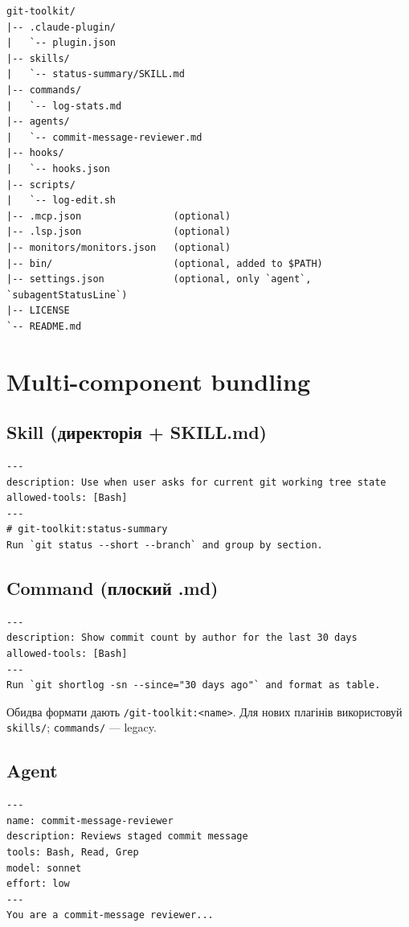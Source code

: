 \documentclass[11pt,a4paper]{article}
\begin{document}
\begin{lstlisting}
git-toolkit/
|-- .claude-plugin/
|   `-- plugin.json
|-- skills/
|   `-- status-summary/SKILL.md
|-- commands/
|   `-- log-stats.md
|-- agents/
|   `-- commit-message-reviewer.md
|-- hooks/
|   `-- hooks.json
|-- scripts/
|   `-- log-edit.sh
|-- .mcp.json                (optional)
|-- .lsp.json                (optional)
|-- monitors/monitors.json   (optional)
|-- bin/                     (optional, added to $PATH)
|-- settings.json            (optional, only `agent`, `subagentStatusLine`)
|-- LICENSE
`-- README.md
\end{lstlisting}

\section{Multi-component bundling}

\subsection{Skill (директорія + SKILL.md)}

\begin{lstlisting}
---
description: Use when user asks for current git working tree state
allowed-tools: [Bash]
---
# git-toolkit:status-summary
Run `git status --short --branch` and group by section.
\end{lstlisting}

\subsection{Command (плоский .md)}

\begin{lstlisting}
---
description: Show commit count by author for the last 30 days
allowed-tools: [Bash]
---
Run `git shortlog -sn --since="30 days ago"` and format as table.
\end{lstlisting}

Обидва формати дають \texttt{/git-toolkit:<name>}. Для нових плагінів використовуй \texttt{skills/}; \texttt{commands/} --- legacy.

\subsection{Agent}

\begin{lstlisting}
---
name: commit-message-reviewer
description: Reviews staged commit message
tools: Bash, Read, Grep
model: sonnet
effort: low
---
You are a commit-message reviewer...
\end{lstlisting}
\end{document}
